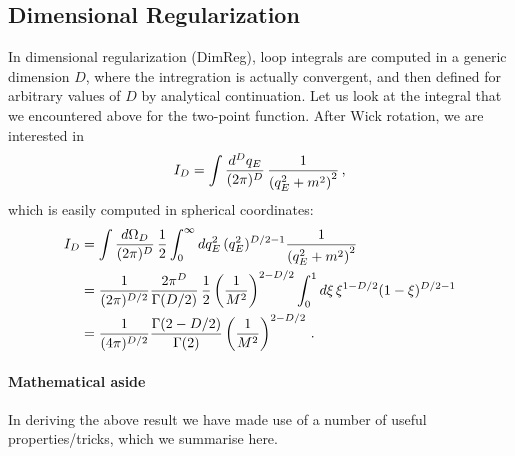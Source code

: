 \subsection{Dimensional Regularization}
\label{sec:dimens-regul}

In dimensional regularization (DimReg), loop integrals are computed in
a generic dimension $D$, where the intregration is actually
convergent, and then defined for arbitrary values of $D$ by analytical
continuation. Let us look at the integral that we encountered above
for the two-point function. After Wick rotation, we are interested in
\begin{equation}
  \label{eq:FirstExDimReg}
  I_D = \int \frac{d^Dq_E}{(2\pi)^D}\, \frac{1}{\left(q_E^2+m^2\right)^2}\, ,
\end{equation}
which is easily computed in spherical coordinates:
\begin{align}
  I_D &= \int \frac{d\Omega_D}{(2\pi)^D}\,
        \frac12 \int_0^\infty dq_E^2\, (q_E^2)^{D/2-1} \frac{1}{\left(q_E^2+m^2\right)^2}
  \\
      &= \frac{1}{(2\pi)^{D/2}} \frac{2\pi^D}{\Gamma(D/2)}\,
        \frac12 \left(\frac{1}{M^2}\right)^{2-D/2} \int_0^1 d\xi \,
        \xi^{1-D/2} (1-\xi)^{D/2-1} \\
  \label{eq:IDResult}
      &= \frac{1}{(4\pi)^{D/2}} \frac{\Gamma(2-D/2)}{\Gamma(2)}
        \left(\frac{1}{M^2}\right)^{2-D/2}\, .
\end{align}

\paragraph{Mathematical aside}

In deriving the above result we have made use of a number of useful
properties/tricks, which we summarise here.

